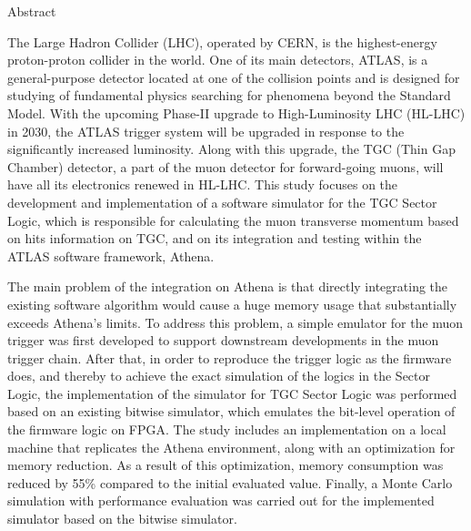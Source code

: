 \begin{abstractpage}{Abstract}



    The Large Hadron Collider (LHC), operated by CERN, is the highest-energy proton-proton collider in the world. One of its main detectors, ATLAS, is a general-purpose detector located at one of the collision points and is designed for studying of fundamental physics searching for phenomena beyond the Standard Model. With the upcoming Phase-II upgrade to High-Luminosity LHC (HL-LHC) in 2030, the ATLAS trigger system will be upgraded in response to the significantly increased luminosity. Along with this upgrade, the TGC (Thin Gap Chamber) detector, a part of the muon detector for forward-going muons, will have all its electronics renewed in HL-LHC. This study focuses on the development and implementation of a software simulator for the TGC Sector Logic, which is responsible for calculating the muon transverse momentum based on hits information on TGC, and on its integration and testing within the ATLAS software framework, Athena.

    The main problem of the integration on Athena is that directly integrating the existing software algorithm would cause a huge memory usage that substantially exceeds Athena’s limits. To address this problem, a simple emulator for the muon trigger was first developed to support downstream developments in the muon trigger chain. After that, in order to reproduce the trigger logic as the firmware does, and thereby to achieve the exact simulation of the logics in the Sector Logic, the implementation of the simulator for TGC Sector Logic was performed based on an existing bitwise simulator, which emulates the bit-level operation of the firmware logic on FPGA. The study includes an implementation on a local machine that replicates the Athena environment, along with an optimization for memory reduction. As a result of this optimization, memory consumption was reduced by 55\% compared to the initial evaluated value. Finally, a Monte Carlo simulation with performance evaluation was carried out for the implemented simulator based on the bitwise simulator.

\end{abstractpage}
